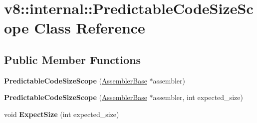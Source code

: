 \hypertarget{classv8_1_1internal_1_1_predictable_code_size_scope}{}\section{v8\+:\+:internal\+:\+:Predictable\+Code\+Size\+Scope Class Reference}
\label{classv8_1_1internal_1_1_predictable_code_size_scope}
\subsection*{Public Member Functions}
\begin{DoxyCompactItemize}
\item 
{\bfseries Predictable\+Code\+Size\+Scope} (\hyperlink{classv8_1_1internal_1_1_assembler_base}{Assembler\+Base} $\ast$assembler)\hypertarget{classv8_1_1internal_1_1_predictable_code_size_scope_ad67493ad4c20816f38040d469c50adb4}{}\label{classv8_1_1internal_1_1_predictable_code_size_scope_ad67493ad4c20816f38040d469c50adb4}

\item 
{\bfseries Predictable\+Code\+Size\+Scope} (\hyperlink{classv8_1_1internal_1_1_assembler_base}{Assembler\+Base} $\ast$assembler, int expected\+\_\+size)\hypertarget{classv8_1_1internal_1_1_predictable_code_size_scope_ae85d285b218bedb8bd2ab9d3c37a930d}{}\label{classv8_1_1internal_1_1_predictable_code_size_scope_ae85d285b218bedb8bd2ab9d3c37a930d}

\item 
void {\bfseries Expect\+Size} (int expected\+\_\+size)\hypertarget{classv8_1_1internal_1_1_predictable_code_size_scope_a65529db546abc8656442cfe26588d8a3}{}\label{classv8_1_1internal_1_1_predictable_code_size_scope_a65529db546abc8656442cfe26588d8a3}

\end{DoxyCompactItemize}
